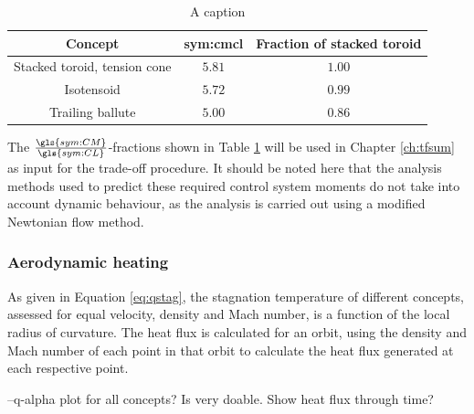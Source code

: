 \begin{table}[h]
	\centering
	\caption{A caption}
	\begin{tabular}{|c|c|c|}
		\hline
		\textbf{Concept} & \textbf{\gls{sym:cmcl}} & \textbf{Fraction of stacked toroid} \\ \hline \hline
		Stacked toroid, tension cone & $5.81$ & $1.00$\\
		Isotensoid & $5.72$ & $0.99$\\
		Trailing ballute & $5.00$ & $0.86$\\
		\hline
	\end{tabular}
	\label{tab:controlmass}
\end{table}

The $\frac{\gls{sym:CM}}{\gls{sym:CL}}$-fractions shown in Table \ref{tab:controlmass} will be used in Chapter \ref{ch:tfsum} as input for the trade-off procedure. It should be noted here that the analysis methods used to predict these required control system moments do not take into account dynamic behaviour, as the analysis is carried out using a modified Newtonian flow method.

\subsubsection{Aerodynamic heating}
As given in Equation \ref{eq:qstag}, the stagnation temperature of different concepts, assessed for equal velocity, density and Mach number, is a function of the local radius of curvature. The heat flux is calculated for an orbit, using the density and Mach number of each point in that orbit to calculate the heat flux generated at each respective point.

--q-alpha plot for all concepts? Is very doable. Show heat flux through time?